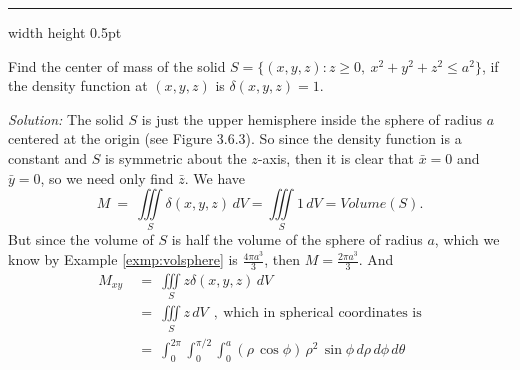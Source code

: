 \vspace{3mm}
\hrule width \textwidth height 0.5pt
\begin{exmp}\label{exmp:uspherecenter}
 Find the center of mass of the solid $S = \lbrace (x,y,z): z \ge 0,~ x^2 + y^2 + z^2 \le a^2 \rbrace$,
 if the density function at $(x,y,z)$ is $\delta(x,y,z) = 1$.\vspace{0.5mm}
 \piccaption[]{}
 \par\noindent \emph{Solution:} The solid $S$ is just the upper hemisphere inside the sphere of radius $a$ centered at
 the origin (see Figure 3.6.3). So since the density function is a constant and $S$ is symmetric about the $z$-axis,
 then it is clear that $\bar{x}=0$ and $\bar{y}=0$, so we need only find $\bar{z}$. We have
 \begin{displaymath}
  M ~=~ \iiint\limits_{S} \delta(x,y,z)\,dV = \iiint\limits_{S} 1\,dV = Volume(S).
 \end{displaymath}
 But since the volume of $S$ is half the volume of the sphere of radius $a$, which we know by Example
 \ref{exmp:volsphere} is $\frac{4\pi a^3}{3}$, then $M = \frac{2\pi a^3}{3}$. And
 \begin{align*}
  M_{xy} ~&=~ \iiint\limits_{S} z\delta(x,y,z)\,dV\\
  &=~ \iiint\limits_{S} z\,dV ~~,~\text{which in spherical coordinates is}\\
  &=~ \int_0^{2\pi} \int_0^{\pi /2} \int_0^a (\rho\,\cos \phi )\,\rho^2 \,\sin \phi \,d\rho\,d\phi\,d\theta\\[8pt]

\end{align*}
\end{exmp}
